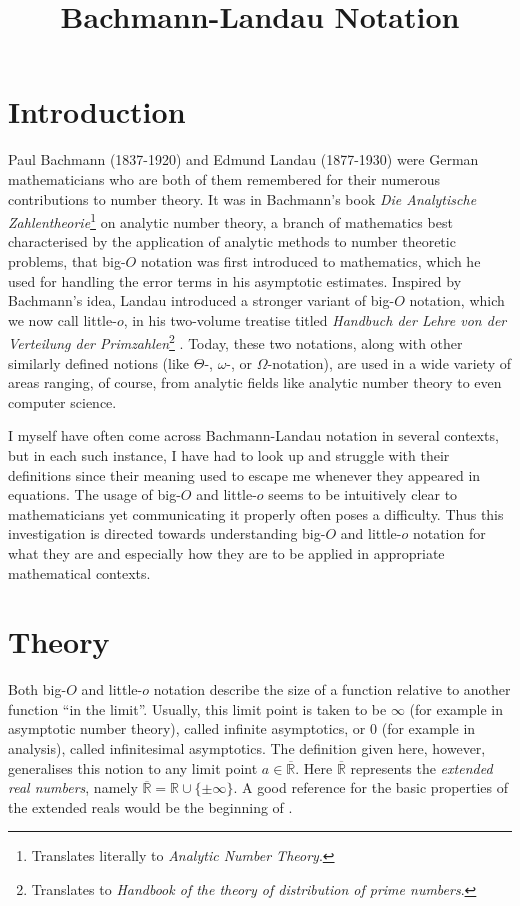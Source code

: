 \documentclass{article}
\title{Bachmann-Landau Notation}
\date{}
\theoremstyle{definition}
\newcommand\RR{\mathbb R}
\newcommand\RRE{\overline{\mathbb R}}
\begin{document}
\maketitle

\section{Introduction}\label{sec:introduction}

Paul Bachmann (1837-1920) and Edmund Landau (1877-1930) were German mathematicians who are both of them remembered for their numerous contributions to number theory.
It was in Bachmann's book \textit{Die Analytische Zahlentheorie}\footnote{Translates literally to \textit{Analytic Number Theory}.} \cite{Bachmann1894} on analytic number theory, a branch of mathematics best characterised by the application of analytic methods to number theoretic problems, that big-$O$ notation was first introduced to mathematics, which he used for handling the error terms in his asymptotic estimates.
Inspired by Bachmann's idea, Landau introduced a stronger variant of big-$O$ notation, which we now call little-$o$, in his two-volume treatise titled \textit{Handbuch der Lehre von der Verteilung der Primzahlen}\footnote{Translates to \textit{Handbook of the theory of distribution of prime numbers}.} \cite{Landau1909}.
Today, these two notations, along with other similarly defined notions (like \(\Theta\)-, \(\omega\)-, or \(\Omega\)-notation), are used in a wide variety of areas ranging, of course, from analytic fields like analytic number theory to even computer science.

I myself have often come across Bachmann-Landau notation in several contexts, but in each such instance, I have had to look up and struggle with their definitions since their meaning used to escape me whenever they appeared in equations.
The usage of big-$O$ and little-$o$ seems to be intuitively clear to mathematicians yet communicating it properly often poses a difficulty.
Thus this investigation is directed towards understanding big-$O$ and little-$o$ notation for what they are and especially how they are to be applied in appropriate mathematical contexts.

\section{Theory}\label{sec:theory}

Both big-$O$ and little-$o$ notation describe the size of a function relative to another function ``in the limit''.
Usually, this limit point is taken to be \(\infty\) (for example in asymptotic number theory), called infinite asymptotics, or \(0\) (for example in analysis), called infinitesimal asymptotics.
The definition given here, however, generalises this notion to any limit point \(a\in\RRE\).
Here \(\RRE\) represents the \textit{extended real numbers}, namely \(\RRE = \RR \cup \{\pm\infty\}\).
A good reference for the basic properties of the extended reals would be the beginning of \cite{Rudin1953}.
\end{document}
